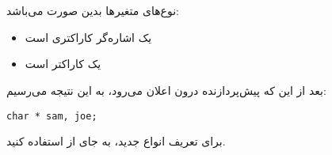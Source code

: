 \section{}
\paragraph{}\label{answer:78}
نوع‌های متغیرها بدین صورت می‌باشد:
\begin{itemize}
    \item {} یک اشاره‌گر کاراکتری است
	\item {} یک کاراکتر است 
\end{itemize}

بعد از این که پیش‌پردازنده درون اعلان می‌رود، به این نتیجه می‌رسیم:
\begin{LTR}
        \begin{lstlisting}[style=C++Style]
            char * sam, joe;
        \end{lstlisting}
\end{LTR}

برای تعریف انواع جدید، به جای  از  استفاده کنید.